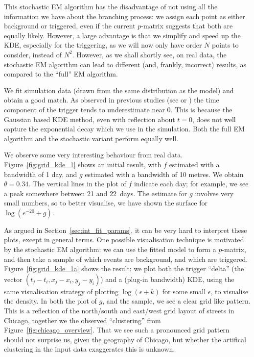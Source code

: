 \documentclass[twoside,a4paper]{article}
\theoremstyle{plain}
\theoremstyle{definition}
\begin{document}
This stochastic EM algorithm has the disadvantage of not using all the information we have about
the branching process: we assign each point as either background or triggered, even if the
current $p$-matrix suggests that both are equally likely.  However, a large advantage is that
we simplify and speed up the KDE, especially for the triggering, as we will now only have order
$N$ points to consider, instead of $N^2$.  However, as we shall shortly see, on real data,
the stochastic EM algorithm can lead to different (and, frankly, incorrect) results, as compared
to the ``full'' EM algorithm.

We fit simulation data (drawn from the same distribution as the model) and obtain a good match.
As observed in previous studies (see \cite{sepp2} or \cite[Figure~3]{rc}) the time component of
the trigger tends to underestimate near $0$.  This is because the Gaussian based KDE method,
even with reflection about $t=0$, does not well capture the exponential decay which we use
in the simulation.  Both the full EM algorithm and the stochastic variant perform equally well.

We observe some very interesting behaviour from real data.  Figure~\ref{fig:grid_kde_1} shows
an initial result, with $f$ estimated with a bandwidth of 1 day, and $g$ estimated with a bandwidth
of 10 metres.  We obtain $\theta=0.34$.  The vertical lines in the plot of $f$ indicate each day;
for example, we see a peak somewhere between 21 and 22~days.
The estimate for $g$ involves very small numbers, so to better visualise, we have shown the
surface for $\log(e^{-20}+g)$.

As argued in Section~\ref{sec:int_fit_params}, it can be very hard
to interpret these plots, except in general terms.  One possible visualisation technique is motivated
by the stochastic EM algorithm: we can use the fitted model to form a $p$-matrix, and then take
a sample of which events are background, and which are triggered.  Figure~\ref{fig:grid_kde_1a}
shows the result: we plot both the trigger ``delta'' (the vector $(t_j-t_i, x_j-x_i, y_j-y_i)$)
and a (plug-in bandwidth) KDE, using the same visualisation strategy of plotting $\log(\epsilon+k)$
for some small $\epsilon$, to visualise the density.  In both the plot of $g$, and the sample,
we see a clear grid like pattern.  This is a reflection of the north/south and east/west grid
layout of streets in Chicago, together we the observed ``clustering'' from
Figure~\ref{fig:chicago_overview}.  That we see such a pronounced grid pattern should not surprise
us, given the geography of Chicago, but whether the artifical clustering in the input data
exaggerates this is unknown.
\end{document}
